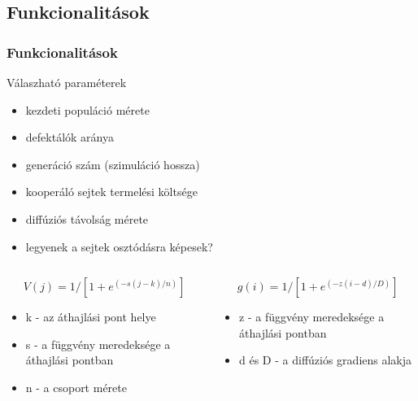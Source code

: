 \subsection{Funkcionalitások}
\begin{frame}
	\frametitle{Funkcionalitások}
	\begin{block}{Válaszható paraméterek}
		\begin{itemize}
			\item kezdeti populáció mérete
			\item defektálók aránya 
			\item generáció szám (szimuláció hossza)
			\item kooperáló sejtek termelési költsége 
			\item diffúziós távolság mérete
			\item legyenek a sejtek osztódásra képesek?
		\end{itemize}
	\end{block}

	\begin{block}{}
		\begin{columns}[T]
			\begin{column}{0.5\linewidth}
				\begin{equation}
				V(j) = 1/[1 + e^{(-s(j-k)/n)}]
				\end{equation}
				\begin{itemize}
					\vspace{-1cm}
					\item k - az áthajlási pont helye
					\item s - a függvény meredeksége a áthajlási pontban
					\item n - a csoport mérete
				\end{itemize}
			\end{column}
			\begin{column}{0.5\linewidth}
				\begin{equation}
				g(i) = 1/[1 + e^{(-z(i-d)/D)}]
				\end{equation}
			\begin{itemize}
				\vspace{-1cm}
				\item z - a függvény meredeksége a áthajlási pontban
				\item d és D - a diffúziós gradiens alakja
			\end{itemize}
			\end{column}
		\end{columns}
	\end{block}
\end{frame}

